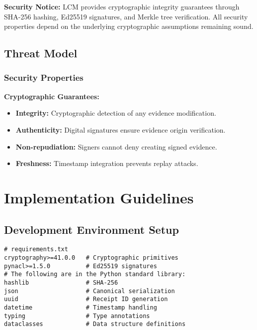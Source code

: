 \documentclass[12pt,a4paper]{article}
\begin{document}
\begin{alertbox}
\textbf{Security Notice:} LCM provides cryptographic integrity guarantees through SHA-256 hashing, Ed25519 signatures, and Merkle tree verification. All security properties depend on the underlying cryptographic assumptions remaining sound.
\end{alertbox}

\subsection{Threat Model}

\subsubsection{Security Properties}

\begin{technicalbox}
\textbf{Cryptographic Guarantees:}
\begin{itemize}[leftmargin=*]
\item \textbf{Integrity:} Cryptographic detection of any evidence modification.
\item \textbf{Authenticity:} Digital signatures ensure evidence origin verification.
\item \textbf{Non-repudiation:} Signers cannot deny creating signed evidence.
\item \textbf{Freshness:} Timestamp integration prevents replay attacks.
\end{itemize}
\end{technicalbox}

\section{Implementation Guidelines}

\subsection{Development Environment Setup}

\begin{lstlisting}[caption={Required Dependencies}]
# requirements.txt
cryptography>=41.0.0   # Cryptographic primitives
pynacl>=1.5.0          # Ed25519 signatures
# The following are in the Python standard library:
hashlib                # SHA-256
json                   # Canonical serialization
uuid                   # Receipt ID generation
datetime               # Timestamp handling
typing                 # Type annotations
dataclasses            # Data structure definitions
\end{lstlisting}
\end{document}
